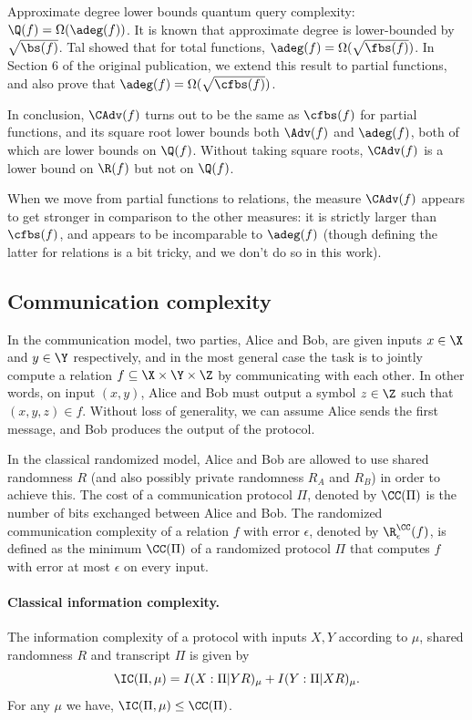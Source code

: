 Approximate degree lower bounds quantum query complexity:
$\Q(f)=\Omega(\adeg(f))$.
It is known \cite{BBC+01} that approximate
degree is lower-bounded by $\sqrt{\bs(f)}$.
Tal \cite{Tal13} showed that for total functions,
$\adeg(f)=\Omega(\sqrt{\fbs(f)})$.
In Section 6 of the original publication, we extend this result to partial
functions, and also prove that
$\adeg(f)=\Omega(\sqrt{\cfbs(f)})$.

In conclusion, $\CAdv(f)$ turns out to be the same
as $\cfbs(f)$ for partial functions,
and its square root lower bounds both
$\Adv(f)$ and $\adeg(f)$, both of which are lower bounds
on $\Q(f)$. Without taking square roots,
$\CAdv(f)$ is a lower bound on $\R(f)$
but not on $\Q(f)$.

When we move from partial functions
to relations, the measure $\CAdv(f)$ appears to get stronger
in comparison to the other measures: it is
strictly larger than $\cfbs(f)$, and appears to be
incomparable to $\adeg(f)$ (though defining the
latter for relations is a bit tricky, and we don't
do so in this work).


\subsection{Communication complexity}

In the communication model, two parties, Alice and Bob, are given inputs $x\in\X$ and $y\in\Y$ respectively, and in the most general case the task is to jointly compute a relation $f\subseteq \X\times\Y\times\Z$ by communicating with each other. In other words, on input $(x,y)$,
Alice and Bob must output a symbol
$z\in\Z$ such that $(x,y,z)\in f$.
Without loss of generality, we can assume Alice sends the first message, and Bob produces the output of the protocol.

In the classical randomized model, Alice and Bob are allowed to use shared randomness $R$ (and also possibly private randomness $R_A$ and $R_B$) in order to achieve this. The cost of a communication protocol $\Pi$, denoted by $\CC(\Pi)$ is the number of bits exchanged between Alice and Bob. The randomized communication complexity of a relation $f$ with error $\epsilon$, denoted by $\R^\CC_\epsilon(f)$, is defined as the minimum $\CC(\Pi)$ of a randomized protocol $\Pi$ that computes $f$ with error at most $\epsilon$ on every input.

\paragraph{Classical information complexity.} The information complexity of a protocol with inputs $X,Y$ according to $\mu$, shared randomness $R$ and transcript $\Pi$ is given by
\[ \IC(\Pi,\mu) = I(X:\Pi|YR)_\mu + I(Y:\Pi|XR)_\mu.\]
For any $\mu$ we have, $\IC(\Pi,\mu) \leq \CC(\Pi)$.

